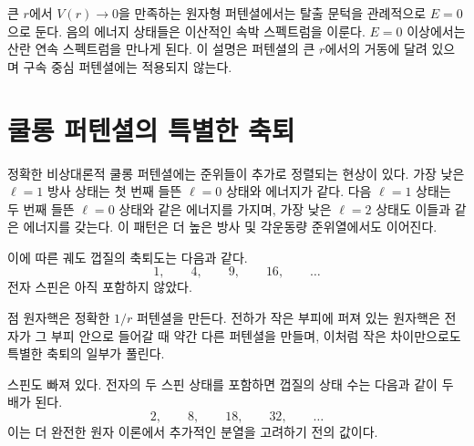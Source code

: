 큰 \(r\)에서 \(V(r)\to0\)을 만족하는 원자형 퍼텐셜에서는 탈출 문턱을 관례적으로 \(E=0\)으로 둔다. 음의 에너지 상태들은 이산적인 속박 스펙트럼을 이룬다. \(E=0\) 이상에서는 산란 연속 스펙트럼을 만나게 된다. 이 설명은 퍼텐셜의 큰 \(r\)에서의 거동에 달려 있으며 구속 중심 퍼텐셜에는 적용되지 않는다.

\section{쿨롱 퍼텐셜의 특별한 축퇴}

정확한 비상대론적 쿨롱 퍼텐셜에는 준위들이 추가로 정렬되는 현상이 있다. 가장 낮은 \(\ell=1\) 방사 상태는 첫 번째 들뜬 \(\ell=0\) 상태와 에너지가 같다. 다음 \(\ell=1\) 상태는 두 번째 들뜬 \(\ell=0\) 상태와 같은 에너지를 가지며, 가장 낮은 \(\ell=2\) 상태도 이들과 같은 에너지를 갖는다. 이 패턴은 더 높은 방사 및 각운동량 준위열에서도 이어진다.

\begin{classroomqa}\end{classroomqa}

이에 따른 궤도 껍질의 축퇴도는 다음과 같다.
\begin{equation}
1,\qquad 4,\qquad 9,\qquad 16,\qquad \ldots
\end{equation}
전자 스핀은 아직 포함하지 않았다.

\begin{classroomqa}\end{classroomqa}

점 원자핵은 정확한 \(1/r\) 퍼텐셜을 만든다. 전하가 작은 부피에 퍼져 있는 원자핵은 전자가 그 부피 안으로 들어갈 때 약간 다른 퍼텐셜을 만들며, 이처럼 작은 차이만으로도 특별한 축퇴의 일부가 풀린다.

스핀도 빠져 있다. 전자의 두 스핀 상태를 포함하면 껍질의 상태 수는 다음과 같이 두 배가 된다.
\begin{equation}
2,\qquad 8,\qquad 18,\qquad 32,\qquad \ldots
\end{equation}
이는 더 완전한 원자 이론에서 추가적인 분열을 고려하기 전의 값이다.

